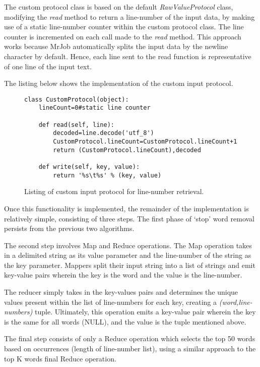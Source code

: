 \documentclass[journal,10pt]{IEEEtran}
\begin{document}
The custom protocol class is based on the default \textit{RawValueProtocol} class, modifying the \textit{read} method to return a line-number of the input data, by making use of a static line-number counter within the custom protocol class. The line counter is incremented on each call made to the \textit{read} method. This approach works because MrJob automatically splits the input data by the newline character by default. Hence, each line sent to the read function is representative of one line of the input text.

The listing below shows the implementation of the custom input protocol.
\begin{figure}[H]
    \centering
    \begin{lstlisting}
class CustomProtocol(object):  
    lineCount=0#static line counter

    def read(self, line):
        decoded=line.decode('utf_8')
        CustomProtocol.lineCount=CustomProtocol.lineCount+1
        return (CustomProtocol.lineCount),decoded

    def write(self, key, value):
        return '%s\t%s' % (key, value)

\end{lstlisting}

    \caption{Listing of custom input protocol for line-number retrieval.}
    \label{fig:my_label}
\end{figure}



Once this functionality is implemented, the remainder of the implementation is relatively simple, consisting of three steps. The first phase of `stop' word removal persists from the previous two algorithms. 

The second step involves Map and Reduce operations. The Map operation takes in a delimited string as its value parameter and the line-number of the string as the key parameter. Mappers split their input string into a list of strings and emit key-value pairs wherein the key is the word and the value is the line-number.

The reducer simply takes in the key-values pairs and determines the unique values present within the list of line-numbers for each key, creating a \textit{(word,line-numbers)} tuple. Ultimately, this operation emits a key-value pair wherein the key is the same for all words (NULL), and the value is the tuple mentioned above. 

The final step consists of only a Reduce operation which selects the top 50 words based on occurrences (length of line-number list), using a similar approach to the top K words final Reduce operation.
\end{document}
